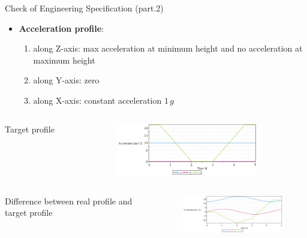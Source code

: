 \documentclass{beamer}              %
\begin{document}
	\begin{frame}{Check of Engineering Specification (part.2)}
		\begin{itemize}
			\footnotesize	
			\item \textbf{Acceleration profile}:
			\begin{enumerate}
				\scriptsize
				\item along Z-axis: max acceleration at minimum height and no acceleration at maximum height 
				\item along Y-axis: zero
				\item along X-axis: constant acceleration $1\,g$
			\end{enumerate}			
		\end{itemize}	
		\begin{columns}
			\begin{column}{0.3\textwidth}		
				\centering Target profile
			\end{column}
			\begin{column}{0.7\textwidth}			
				\begin{figure}									\includegraphics[width=175pt]{grafici/acc_profile.png}
				\end{figure}
			\end{column}
		\end{columns}
		\begin{columns}
			\begin{column}{0.3\textwidth}		
				\centering Difference between real profile and target profile
			\end{column}
			\begin{column}{0.7\textwidth}			
				\begin{figure}									\includegraphics[width=175pt]{grafici/acc_distance.png}
				\end{figure}
			\end{column}
		\end{columns}		
	\end{frame}	
\end{document}
